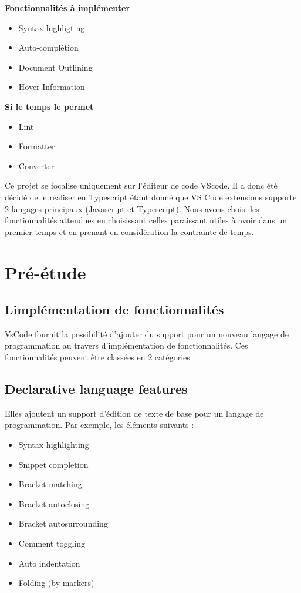 \documentclass[
    iict, %
    il, %
]{heig-tb}
\begin{document}
\textbf{Fonctionnalités à implémenter}
\begin{itemize}
    \item Syntax highligting
    \item Auto-complétion
    \item Document Outlining
    \item Hover Information
\end{itemize}

\textbf{Si le temps le permet}
\begin{itemize}
    \item Lint
    \item Formatter
    \item Converter
\end{itemize}

Ce projet se focalise uniquement sur l'éditeur de code VScode.
Il a donc été décidé de le réaliser en Typescript étant donné que VS Code extensions supporte 2 langages principaux (Javascript et Typescript).
Nous avons choisi les fonctionnalités attendues en choisissant celles paraissant utiles à avoir dans un premier temps et en prenant en considération la contrainte de temps.


\chapter{Pré-étude}

\section{L\textquotesingle implémentation de fonctionnalités}
VsCode fournit la possibilité d'ajouter du support pour un nouveau langage de programmation au travers d'implémentation de fonctionnalités. Ces fonctionnalités peuvent être classées en 2 catégories :

\section{Declarative language features}
Elles ajoutent un support d'édition de texte de base pour un langage de programmation.
Par exemple, les éléments suivants :

\begin{itemize}
    \item Syntax highlighting
    \item Snippet completion
    \item Bracket matching
    \item Bracket autoclosing
    \item Bracket autosurrounding
    \item Comment toggling
    \item Auto indentation
    \item Folding (by markers)
\end{itemize}
\end{document}
